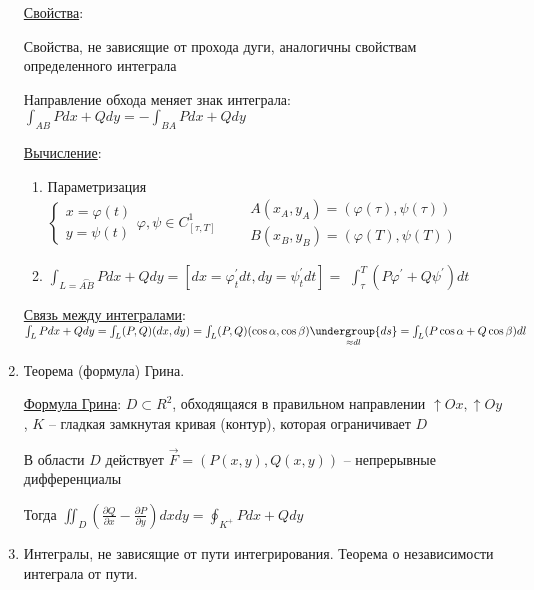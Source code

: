 \documentclass[12pt]{article}
\begin{document}
\begin{enumerate}
        \hyperlink{curvilinearintegraloffirstkindproperties}{Свойства}:

        Свойства, не зависящие от прохода дуги, аналогичны свойствам определенного интеграла

        Направление обхода меняет знак интеграла: $\int_{AB}Pdx + Qdy = -\int_{BA}Pdx + Qdy$

        \hyperlink{curvilinearintegraloffirstkindcalculation}{Вычисление}:

        \begin{enumerate}
            \item Параметризация $\begin{cases}
                x = \varphi(t) \\
                y = \psi(t)
            \end{cases} \varphi, \psi \in C^1_{[\tau, T]} \quad\quad \begin{matrix}
                A(x_A, y_A) = (\varphi(\tau), \psi(\tau)) \\
                B(x_B, y_B) = (\varphi(T), \psi(T))
            \end{matrix}$

            \item $\int_{L = \overset{\frown}{AB}}Pdx + Qdy = [dx = \varphi_t^\prime dt, dy = \psi_t^\prime dt] = $
            $\int_\tau^T (P\varphi^\prime + Q\psi^\prime)dt$
        \end{enumerate}


        \hyperlink{connectionbetweencurvilinearintegrals}{Связь между интегралами}: $\int_L Pdx + Qdy = \int_L (P, Q)(dx, dy) = \int_L (P, Q) (\cos\alpha, \cos\beta) \underset{\approx dl}{\undergroup{ds}} = \int_L (P\cos\alpha + Q\cos\beta)dl$

        \item Теорема (формула) Грина.

        \hyperlink{formulaGreen}{Формула Грина}: $D \subset R^2$, обходящаяся в правильном направлении $\uparrow Ox, \uparrow Oy$, $K$ -- гладкая замкнутая кривая (контур), которая ограничивает $D$

        В области $D$ действует $\overrightarrow{F} = (P(x, y), Q(x, y))$ -- непрерывные дифференциалы

        Тогда $\iint_D \left(\frac{\partial Q}{\partial x} - \frac{\partial P}{\partial y}\right) dxdy = \oint_{K^+} Pdx + Qdy$

        \item Интегралы, не зависящие от пути интегрирования. Теорема о независимости интеграла от пути.


\end{enumerate}
\end{document}
